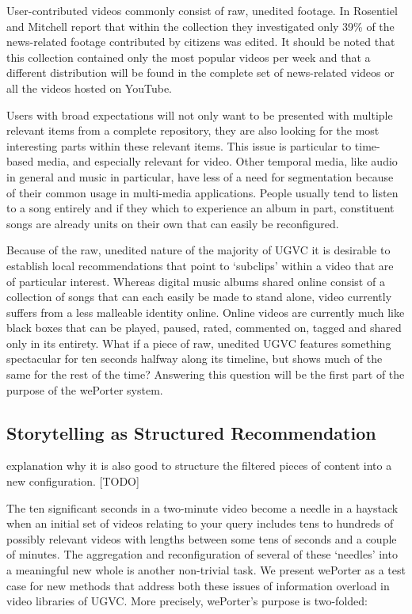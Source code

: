 User-contributed videos commonly consist of raw, unedited footage. In \cite{Rosenstiel:2012vb} Rosentiel and Mitchell report that within the collection they investigated only 39\% of the news-related footage contributed by citizens was edited. It should be noted that this collection contained only the most popular videos per week and that a different distribution will be found in the complete set of news-related videos or all the videos hosted on YouTube. 

Users with broad expectations will not only want to be presented with multiple relevant items from a complete repository, they are also looking for the most interesting parts within these relevant items. This issue is particular to time-based media, and especially relevant for video. Other temporal media, like audio in general and music in particular, have less of a need for segmentation because of  their common usage in multi-media applications. People usually tend to listen to a song entirely and if they which to experience an album in part, constituent songs are already units on their own that can easily be reconfigured.

Because of the raw, unedited nature of the majority of UGVC it is desirable to establish local recommendations that point to `subclips' within a video that are of particular interest. Whereas digital music albums shared online consist of a collection of songs that can each easily be made to stand alone, video currently suffers from a less malleable identity online.  Online videos are currently much like black boxes that can be played, paused, rated, commented on, tagged and shared only in its entirety. What if a piece of raw, unedited UGVC features something spectacular for ten seconds halfway along its timeline, but shows much of the same for the rest of the time? Answering this question will be the first part of the purpose of the wePorter system.

\subsection{Storytelling as Structured Recommendation}

explanation why it is also good to structure the filtered pieces of content into a new configuration.
[TODO]


The ten significant seconds in a two-minute video become a needle in a haystack when an initial set of videos relating to your query includes tens to hundreds of possibly relevant videos with lengths between some tens of seconds and a couple of minutes. The aggregation and reconfiguration of several of these `needles' into a meaningful new whole is another non-trivial task. We present wePorter as a test case for new methods that address both these issues of information overload in video libraries of UGVC. More precisely, wePorter's purpose is two-folded:

